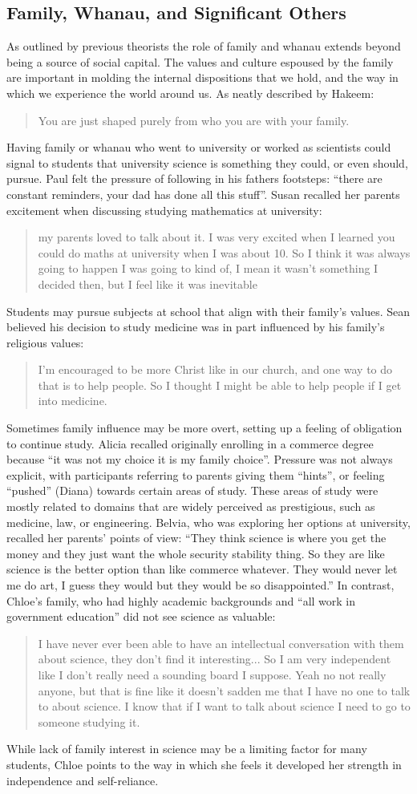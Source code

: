 \subsection{Family, Whanau, and Significant Others}
As outlined by previous theorists \citep{bourdieu1992invitation,Dimaggio1982,Archer_2013,Nash1999} the role of family and whanau extends beyond being a source of social capital. The values and culture espoused by the family are important in molding the internal dispositions that we hold, and the way in which we experience the world around us. As neatly described by Hakeem: \blockquote{You are just shaped purely from who you are with your family.} Having family or whanau who went to university or worked as scientists could signal to students that university science is something they could, or even should, pursue.  Paul felt the pressure of following in his fathers footsteps: ``there are constant reminders, your dad has done all this stuff''. Susan recalled her parents excitement when discussing studying mathematics at university: \blockquote{my parents loved to talk about it. I was very excited when I learned you could do maths at university when I was about 10. So I think it was always going to happen I was going to kind of, I mean it wasn't something I decided then, but I feel like it was inevitable}. 

Students may pursue subjects at school that align with their family's values. Sean believed his decision to study medicine was in part influenced by his family's religious values: \blockquote{I'm encouraged to be more Christ like in our church, and one way to do that is to help people. So I thought I might be able to help people if I get into medicine.} Sometimes family influence may be more overt, setting up a feeling of obligation to continue study. Alicia recalled originally enrolling in a commerce degree because ``it was not my choice it is my family choice''. Pressure was not always explicit, with participants referring to parents giving them ``hints'', or feeling ``pushed'' (Diana) towards certain areas of study. These areas of study were mostly related to domains that are widely perceived as prestigious, such as medicine, law, or engineering. Belvia, who was exploring her options at university, recalled her parents' points of view: ``They think science is where you get the money and they just want the whole security stability thing. So they are like science is the better option than like commerce whatever. They would never let me do art, I guess they would but they would be so disappointed.'' In contrast, Chloe's family, who had highly academic backgrounds and ``all work in government education'' did not see science as valuable: \blockquote{I have never ever been able to have an intellectual conversation with them about science, they don't find it interesting... So I am very independent like I don’t really need a sounding board I suppose. Yeah no not really anyone, but that is fine like it doesn't sadden me that I have no one to talk to about science. I know that if I want to talk about science I need to go to someone studying it.} While lack of family interest in science may be a limiting factor for many students, Chloe points to the way in which she feels it developed her strength in independence and self-reliance.

